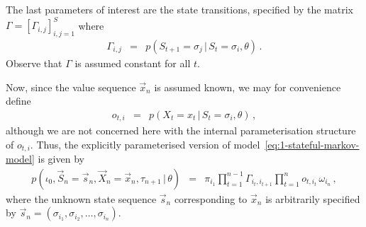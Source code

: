 \documentclass[a4paper]{article}
\begin{document}
The last parameters of interest are the state transitions, specified by the matrix $\Gamma=[\Gamma_{i,j}]_{i,j=1}^{S}$ where
\begin{eqnarray}
  \Gamma_{i,j} & = & p(S_{t+1}\!=\!\sigma_j\,|\,S_t\!=\!\sigma_i,\theta)\,.
\end{eqnarray}
Observe that $\Gamma$ is assumed constant for all $t$.

Now, since the value sequence $\vec{x}_n$ is assumed known, we may for convenience define
\begin{eqnarray}
  o_{t,i} & = & p(X_t\!=\!x_t\,|\,S_t\!=\!\sigma_i,\theta)\,,
\end{eqnarray}
although we are not concerned here with the internal parameterisation structure of $o_{t,i}$.
Thus, the explicitly parameterised version of model~\eqref{eq:1-stateful-markov-model} is given by
\begin{eqnarray}
  p(\iota_0,\vec{S}_n\!=\!\vec{s}_n,\vec{X}_n\!=\!\vec{x}_n,\tau_{n+1}\,|\,\theta) 
&\!\!=\!\!& 
  \pi_{i_1}\prod_{t=1}^{n-1}\Gamma_{i_t,i_{t+1}}\prod_{t=1}^{n}o_{t,i_t}\,\omega_{i_n}
\,,
\label{eq:param-markov-model}
\end{eqnarray}
where the unknown state sequence $\vec{s}_n$ corresponding to $\vec{x}_n$ is arbitrarily
specified by $\vec{s}_n=(\sigma_{i_1},\sigma_{i_2},\ldots,\sigma_{i_n})$.
\end{document}
